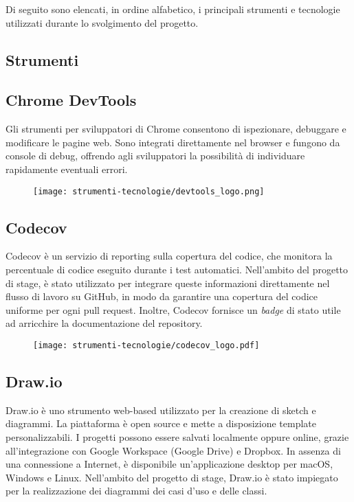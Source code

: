 \par Di seguito sono elencati, in ordine alfabetico, i principali strumenti e tecnologie utilizzati durante lo svolgimento del progetto.

\subsection{Strumenti}

\subsection*{Chrome DevTools}

\par Gli strumenti per sviluppatori di Chrome consentono di ispezionare, debuggare e modificare le pagine web. Sono integrati direttamente nel browser e fungono da console di debug, offrendo agli sviluppatori la possibilità di individuare rapidamente eventuali errori.

\begin{figure}[H]
    \centering 
    \texttt{[image: strumenti-tecnologie/devtools\_logo.png]} 
\end{figure}

\subsection*{Codecov}

\par Codecov è un servizio di reporting sulla copertura del codice, che monitora la percentuale di codice eseguito durante i test automatici. Nell’ambito del progetto di stage, è stato utilizzato per integrare queste informazioni direttamente nel flusso di lavoro su GitHub, in modo da garantire una copertura del codice uniforme per ogni pull request. Inoltre, Codecov fornisce un \textit{badge} di stato utile ad arricchire la documentazione del repository.

\begin{figure}[H]
    \centering 
    \texttt{[image: strumenti-tecnologie/codecov\_logo.pdf]} 
\end{figure}

\subsection*{Draw.io}

\par Draw.io è uno strumento web-based utilizzato per la creazione di sketch e diagrammi. La piattaforma è open source e mette a disposizione template personalizzabili. I progetti possono essere salvati localmente oppure online, grazie all’integrazione con Google Workspace (Google Drive) e Dropbox. In assenza di una connessione a Internet, è disponibile un'applicazione desktop per macOS, Windows e Linux. Nell’ambito del progetto di stage, Draw.io è stato impiegato per la realizzazione dei diagrammi dei casi d’uso e delle classi.

